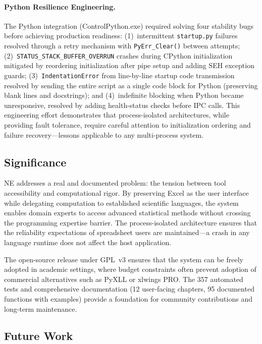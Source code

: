 \documentclass[preprint,12pt,authoryear]{elsarticle}
\newcommand{\neven}{NE\raisebox{0.2ex}{v}\rotatebox[origin=c]{180}{E}\rotatebox[origin=c]{180}{N}}
\begin{document}
\paragraph{Python Resilience Engineering.}
The Python integration (ControlPython.exe) required solving four stability bugs before achieving production readiness: (1)~intermittent \texttt{startup.py} failures resolved through a retry mechanism with \texttt{PyErr\_Clear()} between attempts; (2)~\texttt{STATUS\_STACK\_BUFFER\_OVERRUN} crashes during CPython initialization mitigated by reordering initialization after pipe setup and adding SEH exception guards; (3)~\texttt{IndentationError} from line-by-line startup code transmission resolved by sending the entire script as a single code block for Python (preserving blank lines and docstrings); and (4)~indefinite blocking when Python became unresponsive, resolved by adding health-status checks before IPC calls. This engineering effort demonstrates that process-isolated architectures, while providing fault tolerance, require careful attention to initialization ordering and failure recovery---lessons applicable to any multi-process system.

\subsection{Significance}

\neven{} addresses a real and documented problem: the tension between tool accessibility and computational rigor. By preserving Excel as the user interface while delegating computation to established scientific languages, the system enables domain experts to access advanced statistical methods without crossing the programming expertise barrier. The process-isolated architecture ensures that the reliability expectations of spreadsheet users are maintained---a crash in any language runtime does not affect the host application.

The open-source release under GPL~v3 ensures that the system can be freely adopted in academic settings, where budget constraints often prevent adoption of commercial alternatives such as PyXLL or xlwings PRO. The 357 automated tests and comprehensive documentation (12 user-facing chapters, 95 documented functions with examples) provide a foundation for community contributions and long-term maintenance.

\subsection{Future Work}
\end{document}
